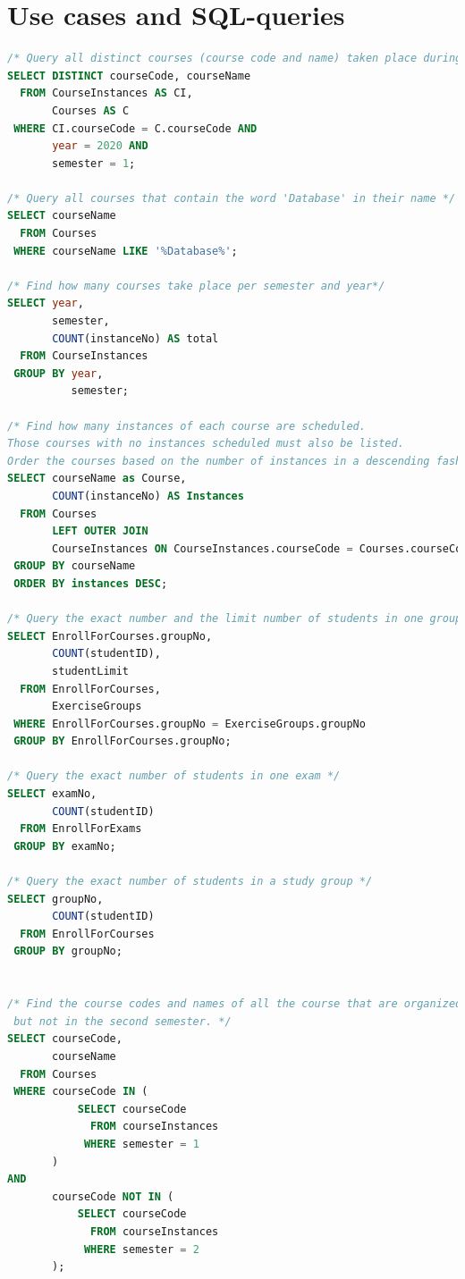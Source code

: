 \documentclass{article}
\begin{document}
\section{Use cases and SQL-queries}
\begin{lstlisting}[language=SQL]
/* Query all distinct courses (course code and name) taken place during the first semester of 2020 */
SELECT DISTINCT courseCode, courseName
  FROM CourseInstances AS CI,
       Courses AS C
 WHERE CI.courseCode = C.courseCode AND 
       year = 2020 AND 
       semester = 1;

/* Query all courses that contain the word 'Database' in their name */
SELECT courseName
  FROM Courses
 WHERE courseName LIKE '%Database%';

/* Find how many courses take place per semester and year*/
SELECT year,
       semester,
       COUNT(instanceNo) AS total
  FROM CourseInstances
 GROUP BY year,
          semester;

/* Find how many instances of each course are scheduled.
Those courses with no instances scheduled must also be listed.
Order the courses based on the number of instances in a descending fashion. */
SELECT courseName as Course,
       COUNT(instanceNo) AS Instances
  FROM Courses
       LEFT OUTER JOIN
       CourseInstances ON CourseInstances.courseCode = Courses.courseCode
 GROUP BY courseName
 ORDER BY instances DESC;

/* Query the exact number and the limit number of students in one group */
SELECT EnrollForCourses.groupNo,
       COUNT(studentID),
       studentLimit
  FROM EnrollForCourses,
       ExerciseGroups
 WHERE EnrollForCourses.groupNo = ExerciseGroups.groupNo
 GROUP BY EnrollForCourses.groupNo;

/* Query the exact number of students in one exam */
SELECT examNo,
       COUNT(studentID) 
  FROM EnrollForExams
 GROUP BY examNo;

/* Query the exact number of students in a study group */
SELECT groupNo,
       COUNT(studentID) 
  FROM EnrollForCourses
 GROUP BY groupNo;


/* Find the course codes and names of all the course that are organized during the second semester,
 but not in the second semester. */
SELECT courseCode,
       courseName
  FROM Courses
 WHERE courseCode IN (
           SELECT courseCode
             FROM courseInstances
            WHERE semester = 1
       )
AND 
       courseCode NOT IN (
           SELECT courseCode
             FROM courseInstances
            WHERE semester = 2
       );


\end{lstlisting}
\end{document}
